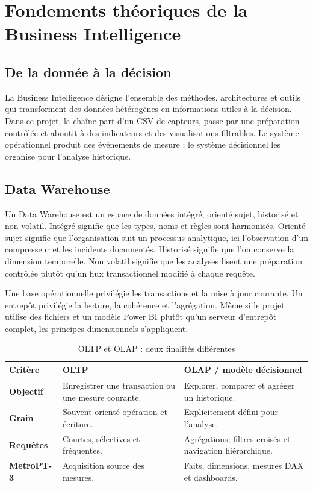 \chapter{Fondements théoriques de la Business Intelligence}

\section{De la donnée à la décision}
La Business Intelligence désigne l'ensemble des méthodes, architectures et outils qui transforment des données hétérogènes en informations utiles à la décision. Dans ce projet, la chaîne part d'un CSV de capteurs, passe par une préparation contrôlée et aboutit à des indicateurs et des visualisations filtrables. Le système opérationnel produit des événements de mesure ; le système décisionnel les organise pour l'analyse historique.

\section{Data Warehouse}
Un Data Warehouse est un espace de données intégré, orienté sujet, historisé et non volatil. Intégré signifie que les types, noms et règles sont harmonisés. Orienté sujet signifie que l'organisation suit un processus analytique, ici l'observation d'un compresseur et les incidents documentés. Historisé signifie que l'on conserve la dimension temporelle. Non volatil signifie que les analyses lisent une préparation contrôlée plutôt qu'un flux transactionnel modifié à chaque requête.

Une base opérationnelle privilégie les transactions et la mise à jour courante. Un entrepôt privilégie la lecture, la cohérence et l'agrégation. Même si le projet utilise des fichiers et un modèle Power BI plutôt qu'un serveur d'entrepôt complet, les principes dimensionnels s'appliquent.

\begin{table}[H]
\centering
\caption{OLTP et OLAP : deux finalités différentes}
\label{tab:oltp-olap}
\begin{tabularx}{\textwidth}{>{\bfseries}l X X}
\toprule
Critère & OLTP & OLAP / modèle décisionnel\\
\midrule
Objectif & Enregistrer une transaction ou une mesure courante. & Explorer, comparer et agréger un historique.\\
Grain & Souvent orienté opération et écriture. & Explicitement défini pour l'analyse.\\
Requêtes & Courtes, sélectives et fréquentes. & Agrégations, filtres croisés et navigation hiérarchique.\\
MetroPT-3 & Acquisition source des mesures. & Faits, dimensions, mesures DAX et dashboards.\\
\bottomrule
\end{tabularx}
\end{table}

